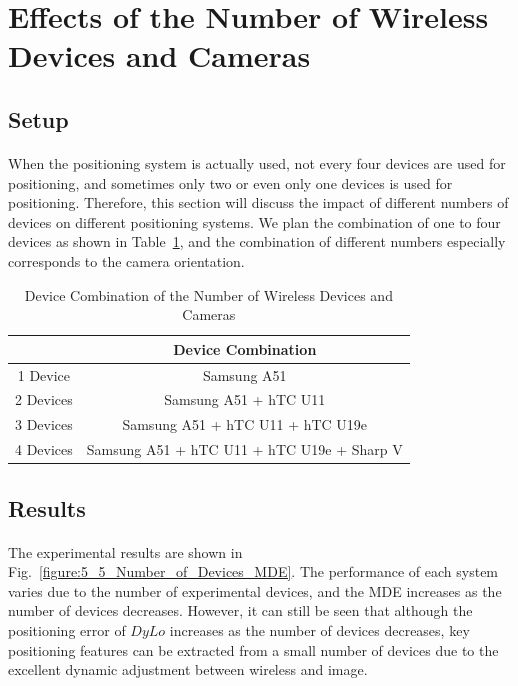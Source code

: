 \documentclass[a4paper,12pt]{report}
\begin{document}
\section{Effects of the Number of Wireless Devices and Cameras}
\subsection{Setup}

\paragraph{}
When the positioning system is actually used, not every four devices are used for positioning, and sometimes only two or even only one devices is used for positioning. Therefore, this section will discuss the impact of different numbers of devices on different positioning systems. We plan the combination of one to four devices as shown in Table~\ref{table:5_5_Device_Combination}, and the combination of different numbers especially corresponds to the camera orientation.

\begin{table}
    \begin{center}
    \caption{Device Combination of the Number of Wireless Devices and Cameras}
    \label{table:5_5_Device_Combination}
        \begin{tabular}{|c|c|}
            \hline
                & Device Combination \\
            \hline
                1 Device  & Samsung A51 \\
            \hline
                2 Devices & Samsung A51 + hTC U11 \\
            \hline
                3 Devices & Samsung A51 + hTC U11 + hTC U19e \\
            \hline
                4 Devices & Samsung A51 + hTC U11 + hTC U19e + Sharp V \\
            \hline
        \end{tabular}
    \end{center}
\end{table}

\subsection{Results}
\paragraph{}
The experimental results are shown in Fig.~\ref{figure:5_5_Number_of_Devices_MDE}. The performance of each system varies due to the number of experimental devices, and the MDE increases as the number of devices decreases. However, it can still be seen that although the positioning error of $DyLo$ increases as the number of devices decreases, key positioning features can be extracted from a small number of devices due to the excellent dynamic adjustment between wireless and image.
%
\end{document}
